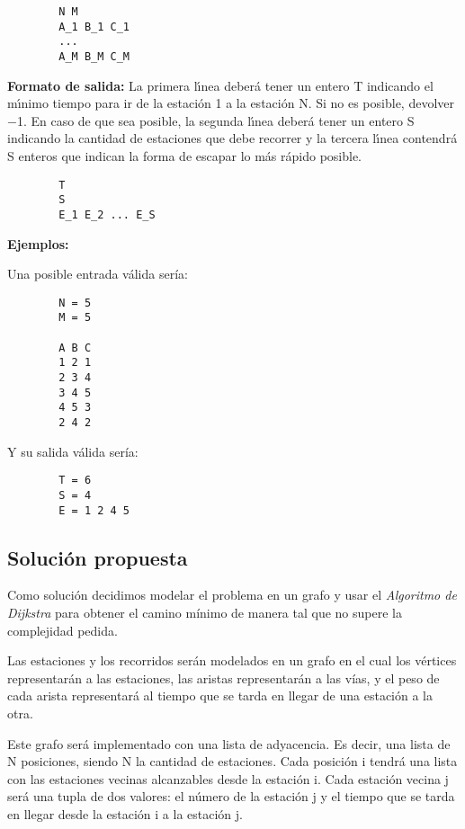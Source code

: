         \begin{verbatim}
        N M
        A_1 B_1 C_1
        ...
        A_M B_M C_M
        \end{verbatim}
        
        \textbf{Formato de salida:} La primera lı́nea deberá tener un entero T indicando el mı́nimo tiempo para ir de la estación 1 a la estación N. Si no es posible, devolver −1. En caso de que sea posible, la segunda lı́nea deberá tener un entero S indicando la cantidad de estaciones que debe recorrer y la tercera lı́nea contendrá S enteros que indican la forma de escapar lo más rápido posible.
        
        \begin{verbatim}
        T
        S
        E_1 E_2 ... E_S
        \end{verbatim}
        
        \textbf{Ejemplos:}
        
        Una posible entrada válida sería:
        
        \begin{verbatim}
        N = 5
        M = 5
        
        A B C 
        1 2 1
        2 3 4
        3 4 5
        4 5 3
        2 4 2
        \end{verbatim}

        Y su salida válida sería:

        \begin{verbatim}
        T = 6
        S = 4
        E = 1 2 4 5
        \end{verbatim}


    \subsection{Solución propuesta}
    
     \par Como solución decidimos modelar el problema en un grafo y usar el \emph{Algoritmo de Dijkstra} para obtener el camino mínimo de manera tal que no supere la complejidad pedida.

    \par Las estaciones y los recorridos serán modelados en un grafo en el cual los vértices representarán a las estaciones, las aristas representarán a las vías, y el peso de cada arista representará al tiempo que se tarda en llegar de una estación a la otra.
    \par Este grafo será implementado con una lista de adyacencia. Es decir, una lista de N posiciones, siendo N la cantidad de estaciones. Cada posición i tendrá una lista con las estaciones vecinas alcanzables desde la estación i. Cada estación vecina j será una tupla de dos valores: el número de la estación j y el tiempo que se tarda en llegar desde la estación i a la estación j.
    
